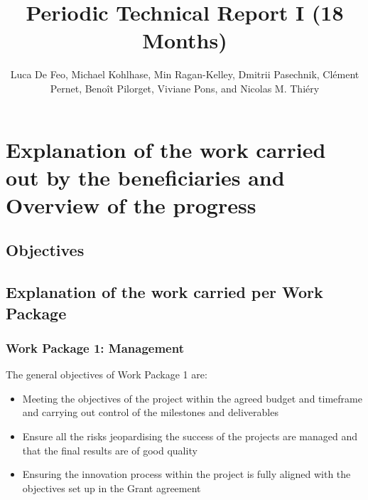 \documentclass{deliverablereport}
\title{Periodic Technical Report I (18 Months)}
\author{Luca De Feo, Michael Kohlhase, Min Ragan-Kelley, Dmitrii Pasechnik, Clément
  Pernet, Benoît Pilorget, Viviane Pons, and Nicolas M. Thiéry}
\begin{document}
\oldmaketitle
\tableofcontents\newpage

\section{Explanation of the work carried out by the beneficiaries and Overview of the progress}


\subsection{Objectives}


\subsection{Explanation of the work carried per Work Package}
\subsubsection{Work Package 1: Management}


The general objectives of Work Package 1 are:

\begin{itemize}
\item{Meeting the objectives of the project within the agreed budget and timeframe and carrying out control of the milestones and deliverables}
\item{Ensure all the risks jeopardising the success of the projects are managed and that the final results are of good quality}
\item{Ensuring the innovation process within the project is fully aligned with the objectives set up in the Grant agreement}
\end{itemize}
\end{document}
